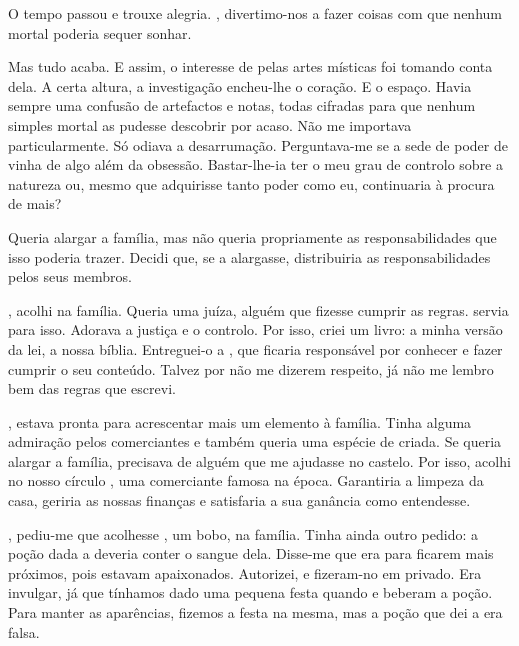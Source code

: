 {O tempo passou e trouxe alegria. , divertimo-nos a fazer coisas com que nenhum mortal poderia sequer sonhar.

Mas tudo acaba. E assim, o interesse de  pelas artes místicas foi tomando conta dela. A certa altura, a investigação encheu-lhe o coração. E o espaço. Havia sempre uma confusão de artefactos e notas, todas cifradas para que nenhum simples mortal as pudesse descobrir por acaso. Não me importava particularmente. Só odiava a desarrumação. Perguntava-me se a sede de poder de  vinha de algo além da obsessão. Bastar-lhe-ia ter o meu grau de controlo sobre a natureza ou, mesmo que adquirisse tanto poder como eu, continuaria à procura de mais?

Queria alargar a família, mas não queria propriamente as responsabilidades que isso poderia trazer. Decidi que, se a alargasse, distribuiria as responsabilidades pelos seus membros.

, acolhi  na família. Queria uma juíza, alguém que fizesse cumprir as regras.  servia para isso. Adorava a justiça e o controlo. Por isso, criei um livro: a minha versão da lei, a nossa bíblia. Entreguei-o a , que ficaria responsável por conhecer e fazer cumprir o seu conteúdo. Talvez por não me dizerem respeito, já não me lembro bem das regras que escrevi.

, estava pronta para acrescentar mais um elemento à família. Tinha alguma admiração pelos comerciantes e também queria uma espécie de criada. Se queria alargar a família, precisava de alguém que me ajudasse no castelo. Por isso, acolhi no nosso círculo , uma comerciante famosa na época. Garantiria a limpeza da casa, geriria as nossas finanças e satisfaria a sua ganância como entendesse.

,  pediu-me que acolhesse , um bobo, na família. Tinha ainda outro pedido: a poção dada a  deveria conter o sangue dela. Disse-me que era para ficarem mais próximos, pois estavam apaixonados. Autorizei, e fizeram-no em privado. Era invulgar, já que tínhamos dado uma pequena festa quando  e  beberam a poção. Para manter as aparências, fizemos a festa na mesma, mas a poção que dei a  era falsa.

}

